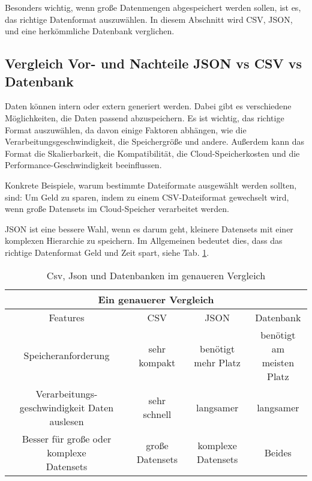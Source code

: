 Besonders wichtig, wenn große Datenmengen abgespeichert werden sollen, ist es, das richtige Datenformat auszuwählen. In diesem Abschnitt wird CSV, JSON, und eine herkömmliche Datenbank verglichen.

\subsection{Vergleich Vor- und Nachteile JSON vs CSV vs Datenbank}

Daten können intern oder extern generiert werden. Dabei gibt es verschiedene Möglichkeiten, die Daten passend abzuspeichern. Es ist wichtig, das richtige Format auszuwählen, da davon einige Faktoren abhängen, wie die Verarbeitungsgeschwindigkeit, die Speichergröße und andere. 
Außerdem kann das Format die Skalierbarkeit, die Kompatibilität, die Cloud-Speicherkosten und die Performance-Geschwindigkeit beeinflussen.

Konkrete Beispiele, warum bestimmte Dateiformate ausgewählt werden sollten, sind: Um Geld zu sparen, indem zu einem CSV-Dateiformat gewechselt wird, wenn große Datensets im Cloud-Speicher verarbeitet werden. 

JSON ist eine bessere Wahl, wenn es darum geht, kleinere Datensets mit einer komplexen Hierarchie zu speichern. 
Im Allgemeinen bedeutet dies, dass das richtige Datenformat Geld und Zeit spart, siehe Tab. \ref{tab:allgemein:csvJsonDatabase}. \cite{csvOrJson}

\begin{table}
    \centering
    \begin{tabular}{ |c|c|c|c| } 
     \hline
     \multicolumn{4}{|c|}{Ein genauerer Vergleich  } \\
     \hline
     \hline
     Features & CSV & JSON & Datenbank \\ 
     \hline 
     \hline
     Speicheranforderung & sehr kompakt & benötigt mehr Platz & \parbox[t][1cm]{3.5cm }{benötigt am \\ meisten Platz} \\ 
     \hline
     \parbox[t][1.5cm]{3.5cm }{Verarbeitungs-geschwindigkeit Daten auslesen} & sehr schnell & langsamer & langsamer \\ 
     \hline
     \parbox[t][1.5cm]{3.5cm }{Besser für große oder komplexe \\ Datensets}  & große Datensets & komplexe Datensets & Beides \\ 
     \hline
    \end{tabular} 
    \caption{Csv, Json und Datenbanken im genaueren Vergleich \cite{csvOrJson}}
    
    \label{tab:allgemein:csvJsonDatabase}
\end{table}

